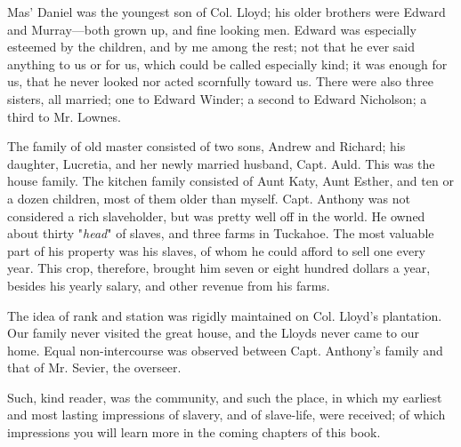 Mas' Daniel was the youngest son of Col. Lloyd; his older brothers were
Edward and Murray---both grown up, and fine looking men. Edward was
especially esteemed by the children, and by me among the rest; not that
he ever said anything to us or for us, which could be called especially
kind; {}it was enough for us, that he never looked nor acted scornfully
toward us. There were also three sisters, all married; one to Edward
Winder; a second to Edward Nicholson; a third to Mr. Lownes.

The family of old master consisted of two sons, Andrew and Richard; his
daughter, Lucretia, and her newly married husband, Capt. Auld. This was
the house family. The kitchen family consisted of Aunt Katy, Aunt
Esther, and ten or a dozen children, most of them older than myself.
Capt. Anthony was not considered a rich slaveholder, but was pretty well
off in the world. He owned about thirty "\emph{head}" of slaves, and
three farms in Tuckahoe. The most valuable part of his property was his
slaves, of whom he could afford to sell one every year. This crop,
therefore, brought him seven or eight hundred dollars a year, besides
his yearly salary, and other revenue from his farms.

The idea of rank and station was rigidly maintained on Col. Lloyd's
plantation. Our family never visited the great house, and the Lloyds
never came to our home. Equal non-intercourse was observed between Capt.
Anthony's family and that of Mr. Sevier, the overseer.

Such, kind reader, was the community, and such the place, in which my
earliest and most lasting impressions of slavery, and of slave-life,
were received; of which impressions you will learn more in the coming
chapters of this book.
